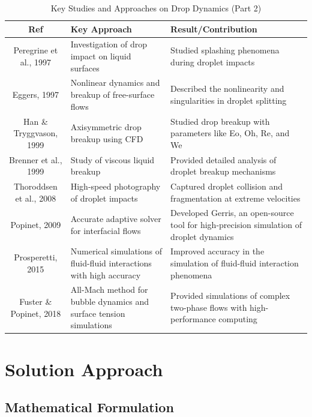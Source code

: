 \documentclass[12pt]{article}
\begin{document}
\begin{table}[htbp]
\scriptsize
\centering
\caption{Key Studies and Approaches on Drop Dynamics (Part 2)}
\renewcommand{\arraystretch}{1.2} %
\begin{tabularx}{\textwidth}{|c|X|X|}
\hline
\textbf{Ref} & \textbf{Key Approach} & \textbf{Result/Contribution} \\ \hline
Peregrine et al., 1997 \cite{peregrine1997impact} & Investigation of drop impact on liquid surfaces & Studied splashing phenomena during droplet impacts \\ \hline
Eggers, 1997 \cite{eggers1997nonlinear} & Nonlinear dynamics and breakup of free-surface flows & Described the nonlinearity and singularities in droplet splitting \\ \hline
Han \& Tryggvason, 1999 \cite{han1999axisymmetric} & Axisymmetric drop breakup using CFD & Studied drop breakup with parameters like Eo, Oh, Re, and We \\ \hline
Brenner et al., 1999 \cite{brenner1999breakup} & Study of viscous liquid breakup & Provided detailed analysis of droplet breakup mechanisms \\ \hline
Thoroddsen et al., 2008 \cite{thoroddsen2008highspeed} & High-speed photography of droplet impacts & Captured droplet collision and fragmentation at extreme velocities \\ \hline
Popinet, 2009 \cite{popinet2009accurate} & Accurate adaptive solver for interfacial flows & Developed Gerris, an open-source tool for high-precision simulation of droplet dynamics \\ \hline
Prosperetti, 2015 \cite{prosperetti2015life} & Numerical simulations of fluid-fluid interactions with high accuracy & Improved accuracy in the simulation of fluid-fluid interaction phenomena \\ \hline
Fuster \& Popinet, 2018 \cite{fuster2018allmach} & All-Mach method for bubble dynamics and surface tension simulations & Provided simulations of complex two-phase flows with high-performance computing \\ \hline
\end{tabularx}
\end{table}




\section{Solution Approach}

\subsection{Mathematical Formulation}
\end{document}
